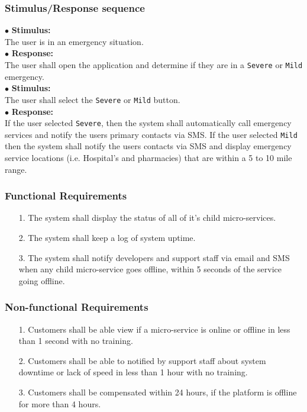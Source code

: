 \documentclass{scrreprt}
\begin{document}
\subsubsection{Stimulus/Response sequence}
\vspace{5mm}
	$\bullet$ \textbf{Stimulus:} \\ \hspace{5mm} The user is in an emergency situation. \\
	$\bullet$ \textbf{Response:} \\ \hspace{5mm} The user shall open the application and determine if they are in a \texttt{Severe} or \texttt{Mild} emergency.
\vspace{5mm}\\
	\hspace{-4.75mm} $\bullet$ \textbf{Stimulus:} \\ \hspace{5mm} The user shall select the \texttt{Severe} or \texttt{Mild} button.\\
	$\bullet$ \textbf{Response:} \\ \hspace{5mm} If the user selected \texttt{Severe}, then the system shall automatically call emergency services and notify the users primary contacts via SMS. If the user selected \texttt{Mild} then the system shall notify the users contacts via SMS and display emergency service locations (i.e. Hospital's and pharmacies) that are within a 5 to 10 mile range. \\


\subsubsection{Functional Requirements}
\begin{enumerate}
	\item[1.] The system shall display the status of all of it's child micro-services.
	\item[2.] The system shall keep a log of system uptime.
	\item[3.] The system shall notify developers and support staff via email and SMS when any child micro-service goes offline, within 5 seconds of the service going offline.
\end{enumerate}


\subsubsection{Non-functional Requirements}
\begin{enumerate}
	\item[1.] Customers shall be able view if a micro-service is online or offline in less than 1 second with no training.
	\item[2.] Customers shall be able to notified by support staff about system downtime or lack of speed in less than 1 hour with no training.
	\item[3.] Customers shall be compensated within 24 hours, if the platform is offline for more than 4 hours.
\end{enumerate}
\end{document}
